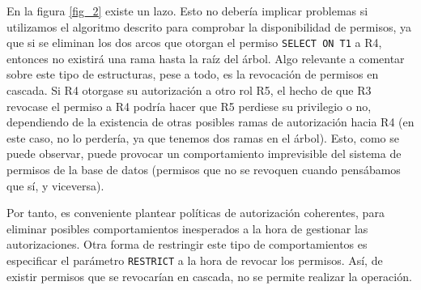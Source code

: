 \documentclass[12pt, a4paper]{article}
\begin{document}
En la figura \ref{fig_2} existe un lazo. Esto no debería implicar problemas si utilizamos el algoritmo descrito para comprobar la disponibilidad de permisos, ya que si se eliminan los dos arcos que otorgan el permiso \texttt{SELECT ON T1} a R4, entonces no existirá una rama hasta la raíz del árbol. Algo relevante a comentar sobre este tipo de estructuras, pese a todo, es la revocación de permisos en cascada. Si R4 otorgase su autorización a otro rol R5, el hecho de que R3 revocase el permiso a R4 podría hacer que R5 perdiese su privilegio o no, dependiendo de la existencia de otras posibles ramas de autorización hacia R4 (en este caso, no lo perdería, ya que tenemos dos ramas en el árbol). Esto, como se puede observar, puede provocar un comportamiento imprevisible del sistema de permisos de la base de datos (permisos que no se revoquen cuando pensábamos que sí, y viceversa).

Por tanto, es conveniente plantear políticas de autorización coherentes, para eliminar posibles comportamientos inesperados a la hora de gestionar las autorizaciones. Otra forma de restringir este tipo de comportamientos es especificar el parámetro \texttt{RESTRICT} a la hora de revocar los permisos. Así, de existir permisos que se revocarían en cascada, no se permite realizar la operación.

\nocite{*}

\end{document}
